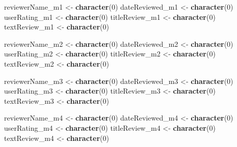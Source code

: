 \documentclass[
]{article}
\newenvironment{Shaded}{\begin{snugshade}}{\end{snugshade}}
\newcommand{\DecValTok}[1]{\textcolor[rgb]{0.00,0.00,0.81}{#1}}
\newcommand{\FunctionTok}[1]{\textcolor[rgb]{0.13,0.29,0.53}{\textbf{#1}}}
\newcommand{\NormalTok}[1]{#1}
\newcommand{\OtherTok}[1]{\textcolor[rgb]{0.56,0.35,0.01}{#1}}
\begin{document}
\begin{Shaded}
\begin{Highlighting}[]
\NormalTok{reviewerName\_m1 }\OtherTok{\textless{}{-}} \FunctionTok{character}\NormalTok{(}\DecValTok{0}\NormalTok{)}
\NormalTok{dateReviewed\_m1 }\OtherTok{\textless{}{-}} \FunctionTok{character}\NormalTok{(}\DecValTok{0}\NormalTok{)}
\NormalTok{userRating\_m1 }\OtherTok{\textless{}{-}} \FunctionTok{character}\NormalTok{(}\DecValTok{0}\NormalTok{)}
\NormalTok{titleReview\_m1 }\OtherTok{\textless{}{-}} \FunctionTok{character}\NormalTok{(}\DecValTok{0}\NormalTok{)}
\NormalTok{textReview\_m1 }\OtherTok{\textless{}{-}} \FunctionTok{character}\NormalTok{(}\DecValTok{0}\NormalTok{)}

\NormalTok{reviewerName\_m2 }\OtherTok{\textless{}{-}} \FunctionTok{character}\NormalTok{(}\DecValTok{0}\NormalTok{)}
\NormalTok{dateReviewed\_m2 }\OtherTok{\textless{}{-}} \FunctionTok{character}\NormalTok{(}\DecValTok{0}\NormalTok{)}
\NormalTok{userRating\_m2 }\OtherTok{\textless{}{-}} \FunctionTok{character}\NormalTok{(}\DecValTok{0}\NormalTok{)}
\NormalTok{titleReview\_m2 }\OtherTok{\textless{}{-}} \FunctionTok{character}\NormalTok{(}\DecValTok{0}\NormalTok{)}
\NormalTok{textReview\_m2 }\OtherTok{\textless{}{-}} \FunctionTok{character}\NormalTok{(}\DecValTok{0}\NormalTok{)}

\NormalTok{reviewerName\_m3 }\OtherTok{\textless{}{-}} \FunctionTok{character}\NormalTok{(}\DecValTok{0}\NormalTok{)}
\NormalTok{dateReviewed\_m3 }\OtherTok{\textless{}{-}} \FunctionTok{character}\NormalTok{(}\DecValTok{0}\NormalTok{)}
\NormalTok{userRating\_m3 }\OtherTok{\textless{}{-}} \FunctionTok{character}\NormalTok{(}\DecValTok{0}\NormalTok{)}
\NormalTok{titleReview\_m3 }\OtherTok{\textless{}{-}} \FunctionTok{character}\NormalTok{(}\DecValTok{0}\NormalTok{)}
\NormalTok{textReview\_m3 }\OtherTok{\textless{}{-}} \FunctionTok{character}\NormalTok{(}\DecValTok{0}\NormalTok{)}

\NormalTok{reviewerName\_m4 }\OtherTok{\textless{}{-}} \FunctionTok{character}\NormalTok{(}\DecValTok{0}\NormalTok{)}
\NormalTok{dateReviewed\_m4 }\OtherTok{\textless{}{-}} \FunctionTok{character}\NormalTok{(}\DecValTok{0}\NormalTok{)}
\NormalTok{userRating\_m4 }\OtherTok{\textless{}{-}} \FunctionTok{character}\NormalTok{(}\DecValTok{0}\NormalTok{)}
\NormalTok{titleReview\_m4 }\OtherTok{\textless{}{-}} \FunctionTok{character}\NormalTok{(}\DecValTok{0}\NormalTok{)}
\NormalTok{textReview\_m4 }\OtherTok{\textless{}{-}} \FunctionTok{character}\NormalTok{(}\DecValTok{0}\NormalTok{)}


\end{Highlighting}
\end{Shaded}
\end{document}
